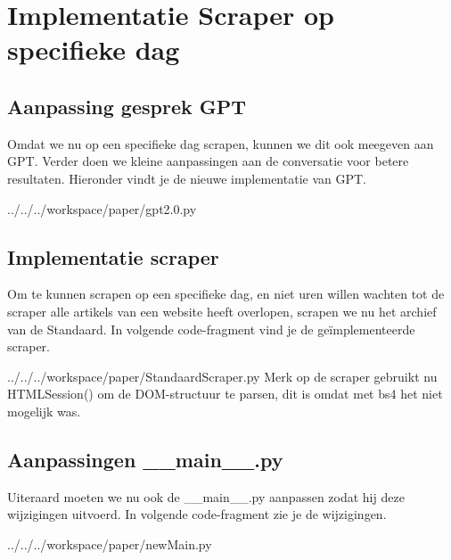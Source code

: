 \section{Implementatie Scraper op specifieke dag}
\label{bijlage:changes_scraper}
\subsection{Aanpassing gesprek GPT}
Omdat we nu op een specifieke dag scrapen, kunnen we dit ook meegeven aan GPT. Verder doen we kleine aanpassingen aan de conversatie voor betere resultaten. Hieronder vindt je de nieuwe implementatie van GPT. 
\begin{pythoncode}{../../../workspace/paper/gpt2.0.py}
\end{pythoncode}

\subsection{Implementatie scraper}
Om te kunnen scrapen op een specifieke dag, en niet uren willen wachten tot de scraper alle artikels van een website heeft overlopen, scrapen we nu het archief van de Standaard. In volgende code-fragment vind je de geïmplementeerde scraper. 
\begin{pythoncode}{../../../workspace/paper/StandaardScraper.py}
    Merk op de scraper gebruikt nu HTMLSession() om de DOM-structuur te parsen, dit is omdat met bs4 het niet mogelijk was. 
\end{pythoncode}

\subsection{Aanpassingen \_\_main\_\_.py}
Uiteraard moeten we nu ook de \_\_main\_\_.py aanpassen zodat hij deze wijzigingen uitvoerd. In volgende code-fragment zie je de wijzigingen. 

\begin{pythoncode}{../../../workspace/paper/newMain.py}

\end{pythoncode}

